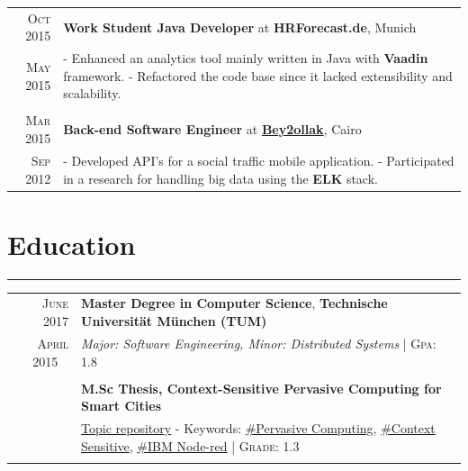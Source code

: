 \documentclass[a4paper,13pt]{article}
\begin{document}
\begin{adjustwidth}{-3cm}{}
\begin{tabular}{r|p{17.5cm}}
\textsc{Oct 2015} & \textbf{Work Student Java Developer} at \textbf{HRForecast.de}, Munich \\
\textsc{May 2015} & \footnotesize{- Enhanced an analytics tool mainly written in Java with \textbf{Vaadin} framework. \newline
- Refactored the code base since it lacked extensibility and scalability.
} \\ 
\multicolumn{2}{c}{} \\


\textsc{Mar 2015} & \textbf{Back-end Software Engineer} at \href{http://desktop.bey2ollak.com/features-mentions/}{\textbf{Bey2ollak}}, Cairo \\
\textsc{Sep 2012} & 

\footnotesize{
	- Developed API's for a social traffic mobile application. \newline 
	- Participated in a research for handling big data using the \textbf{ELK} stack.
}
\end{tabular}





\section{Education}
\rule[0pt]{20cm}{0.5pt}

\begin{tabular}{r|p{17.5cm}}
		

\textsc{June 2017} & \textbf{Master Degree in Computer Science}, \textbf{Technische Universität München (TUM)} \\ \textsc{April} 2015 \
& \small\emph{Major: Software Engineering, Minor: Distributed Systems}
 \normalsize\footnotesize \hfill| \normalsize \textsc{Gpa}: 1.8
\\ \multicolumn{2}{c}{} \\

\textsc{}&
\textbf{M.Sc Thesis, Context-Sensitive Pervasive Computing for Smart Cities}\\
& \href{https://github.com/SalehAly/master-thesis}{Topic repository} - Keywords: \href{https://www.google.de/search?q=Pervasive+Computing}{\#Pervasive Computing}, \href{https://www.google.de/search?q=context+sensitive}{\#Context Sensitive}, \href{nodered.org}{\#IBM Node-red} 
\footnotesize \hfill| \normalsize \textsc{Grade}: 1.3
\\ \multicolumn{2}{c}{} \\



\end{tabular}
\end{adjustwidth}
\end{document}
